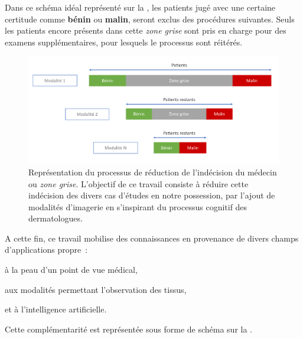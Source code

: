 Dans ce schéma idéal représenté sur la , les patients jugé avec une certaine certitude comme \textbf{bénin} ou \textbf{malin}, seront exclus des procédures suivantes. Seuls les patients encore présents dans cette \textit{zone grise} sont pris en charge pour des examens supplémentaires, pour lesquels le processus sont réitérés.\par 

\begin{figure}[H]
    \centering
    \includegraphics[width=\linewidth]{contents/i_introduction/resources/scheme_reduce_indecision.pdf}
    \caption{Représentation du processus de réduction de l'indécision du médecin ou \textit{zone grise}. L'objectif de ce travail consiste à réduire cette indécision des divers cas d'études en notre possession, par l'ajout de modalités d'imagerie en s'inspirant du processus cognitif des dermatologues.}
    \label{fig:scheme_reduce_indecision}
\end{figure}\par

A cette fin, ce travail mobilise des connaissances en provenance de divers champs d'applications propre~:
\begin{inlinerate}
    \item à la peau d'un point de vue médical, 
    \item aux modalités permettant l'observation des tissus,
    \item et à l'intelligence artificielle.
\end{inlinerate} Cette complémentarité est représentée sous forme de schéma sur la .\par


